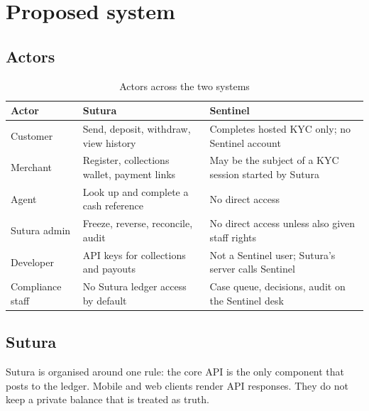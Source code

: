 \documentclass[12pt,a4paper]{article}
\begin{document}
\section{Proposed system}

\subsection{Actors}

\begin{table}[ht]
\centering
\caption{Actors across the two systems}
\label{tab:actors}
\small
\begin{tabularx}{\textwidth}{@{}l X X@{}}
\toprule
\textbf{Actor} & \textbf{Sutura} & \textbf{Sentinel} \\
\midrule
Customer &
Send, deposit, withdraw, view history &
Completes hosted KYC only; no Sentinel account \\
Merchant &
Register, collections wallet, payment links &
May be the subject of a KYC session started by Sutura \\
Agent &
Look up and complete a cash reference &
No direct access \\
Sutura admin &
Freeze, reverse, reconcile, audit &
No direct access unless also given staff rights \\
Developer &
API keys for collections and payouts &
Not a Sentinel user; Sutura's server calls Sentinel \\
Compliance staff &
No Sutura ledger access by default &
Case queue, decisions, audit on the Sentinel desk \\
\bottomrule
\end{tabularx}
\end{table}

\subsection{Sutura}

Sutura is organised around one rule: the core API is the only component that posts to the ledger. Mobile and web clients render API responses. They do not keep a private balance that is treated as truth.
\end{document}

